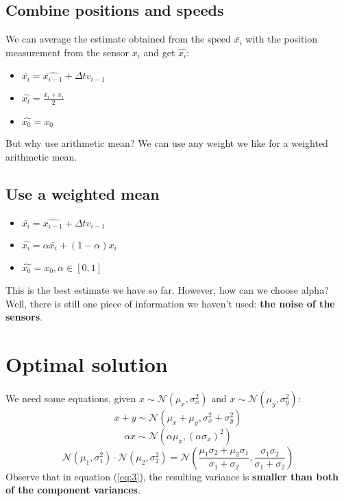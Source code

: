 \documentclass{article}
\begin{document}
\subsection{Combine positions and speeds}
We can average the estimate obtained from the speed $\bar{x_i}$ with the position measurement from the sensor $x_i$ and get $\hat{x_i}$:
\begin{itemize}
    \item $\bar{x_i} = \hat{x_{i-1}} + \Delta tv_{i-1}$
    \item $\hat{x_i} = \frac{\bar{x_i} + x_i}{2}$
    \item $\hat{x_0} = x_0$
\end{itemize}
But why use arithmetic mean? We can use any weight we like for a weighted arithmetic mean.

\subsection{Use a weighted mean}
\begin{itemize}
    \item $\bar{x_i} = \hat{x_{i-1}} + \Delta tv_{i-1}$
    \item $\hat{x_i} = \alpha\bar{x_i} + (1-\alpha)x_i$
    \item $\hat{x_0} = x_0, \alpha\in[0,1]$
\end{itemize}
This is the best estimate we have so far. However, how can we choose alpha? Well, there is still one piece of information we haven't used: \textbf{the noise of the sensors}.
\section{Optimal solution}
We need some equations, given $x \sim \mathcal{N}(\mu_x, \sigma_x^2)$ and $x \sim \mathcal{N}(\mu_y, \sigma_y^2)$:
\begin{equation} \label{eq:1}
    x+y \sim \mathcal{N}(\mu_x + \mu_y, \sigma_x^2 + \sigma_y^2)
\end{equation} 
\begin{equation} \label{eq:2}
    \alpha x \sim \mathcal{N}(\alpha \mu_x, (\alpha \sigma_x)^2)
\end{equation} 
\begin{equation} \label{eq:3}
    \mathcal{N}(\mu_1, \sigma_1^2) \cdot \mathcal{N}(\mu_2, \sigma_2^2) = \mathcal{N}(\frac{\mu_1 \sigma_2 + \mu_2 \sigma_1}{\sigma_1 + \sigma_2}, \frac{\sigma_1 \sigma_2}{\sigma_1 + \sigma_2})
\end{equation}
Observe that in equation (\ref{eq:3}), the resulting variance is \textbf{smaller than both of the component variances}.
\end{document}
